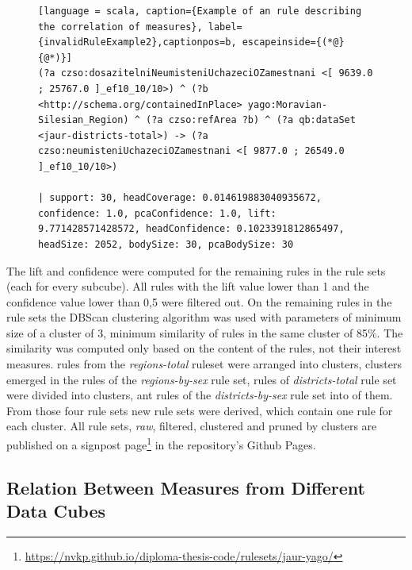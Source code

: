 \begin{figure}[h]
\begin{lstlisting}[language = scala, caption={Example of an rule describing the correlation of measures}, label={invalidRuleExample2},captionpos=b, escapeinside={(*@}{@*)}]
(?a czso:dosazitelniNeumisteniUchazeciOZamestnani <[ 9639.0 ; 25767.0 ]_ef10_10/10>) ^ (?b <http://schema.org/containedInPlace> yago:Moravian-Silesian_Region) ^ (?a czso:refArea ?b) ^ (?a qb:dataSet <jaur-districts-total>) -> (?a czso:neumisteniUchazeciOZamestnani <[ 9877.0 ; 26549.0 ]_ef10_10/10>) 

| support: 30, headCoverage: 0.014619883040935672, confidence: 1.0, pcaConfidence: 1.0, lift: 9.771428571428572, headConfidence: 0.1023391812865497, headSize: 2052, bodySize: 30, pcaBodySize: 30
\end{lstlisting}
\end{figure}

The lift and confidence were computed for the remaining rules in the rule sets (each for every subcube). All rules with the lift value lower than 1 and the confidence value lower than 0,5 were filtered out. On the remaining rules in the rule sets the DBScan clustering algorithm was used with parameters of minimum size of a cluster of 3, minimum similarity of rules in the same cluster of 85\%. The similarity was computed only based on the content of the rules, not their interest measures.  rules from the \textit{regions-total} ruleset were arranged into  clusters,  clusters emerged in the  rules of the \textit{regions-by-sex} rule set,  rules of \textit{districts-total} rule set were divided into  clusters, ant  rules of the \textit{districts-by-sex} rule set into  of them. From those four rule sets new rule sets were derived, which contain one rule for each cluster. All rule sets, \textit{raw}, filtered, clustered and pruned by clusters are published on a signpost page\footnote{\href{https://nvkp.github.io/diploma-thesis-code/rulesets/jaur-yago/}{https://nvkp.github.io/diploma-thesis-code/rulesets/jaur-yago/}} in the repository's Github Pages.

\subsection{Relation Between Measures from Different Data Cubes}

